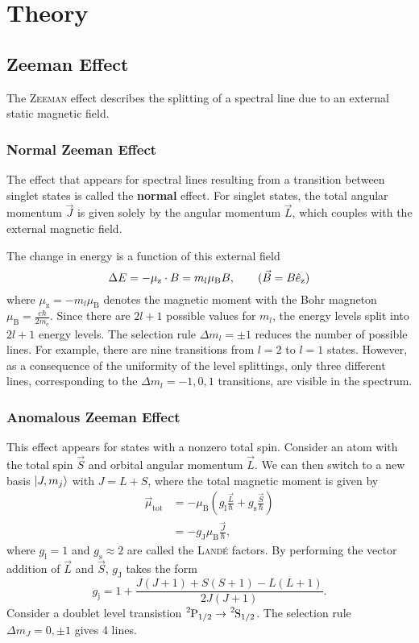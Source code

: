 \chapter{Theory}
\section{Zeeman Effect}\label{sec:zeeman}
The \textsc{Zeeman} effect describes the splitting of a spectral line due to an external static magnetic field.

\subsection{Normal Zeeman Effect}
The effect that appears for spectral lines resulting from a transition between singlet states is called the \textbf{normal} effect.
For singlet states, the total angular momentum $\vec{J}$ is given solely by the angular momentum $\vec{L}$, which couples with the external magnetic field.

The change in energy is a function of this external field
\begin{equation*}
	\Delta E = -\mu_\text{z}\cdot B=m_l\mu_\text{B}B, \tag{$\vec{B}=B\hat{e}_\text{z}$}
\end{equation*}
where $\mu_\text{z}=-m_l\mu_\text{B}$ denotes the magnetic moment with the Bohr magneton $\mu_\text{B}=\frac{e\hbar}{2m_\text{e}}$.
Since there are $2l+1$ possible values for $m_l$, the energy levels split into $2l+1$ energy levels.
The selection rule $\Delta m_l=\pm 1$ reduces the number of possible lines.
For example, there are nine transitions from $l=2$ to $l=1$ states.
However, as a consequence of the uniformity of the level splittings, only three different lines, corresponding to the $\Delta m_l=-1,0,1$ transitions, are visible in the spectrum.

\subsection{Anomalous Zeeman Effect}
This effect appears for states with a nonzero total spin.
Consider an atom with the total spin $\vec{S}$ and orbital angular momentum $\vec{L}$.
We can then switch to a new basis $\ket{J, m_j}$ with $J=L+S$, where the total magnetic moment is given by
\begin{align*}
	\vec{\mu}_\text{tot} &= -\mu_\text{B}\left(g_\text{l}\frac{\vec{L}}{\hbar} + g_\text{s}\frac{\vec{S}}{\hbar}\right) \\
	&= -g_\text{J}\mu_\text{B}\frac{\vec{J}}{\hbar},
\end{align*}
where $g_\text{l} = 1$ and $g_\text{s}\approx 2$ are called the \textsc{Landé} factors.
By performing the vector addition of $\vec{L}$ and $\vec{S}$, $g_\text{J}$ takes the form
\begin{equation*}
	g_\text{j} = 1+\frac{J(J+1)+S(S+1)-L(L+1)}{2J(J+1)}.
\end{equation*}
Consider a doublet level transistion $\ce{^{2}P}_{1/2}\rightarrow \ce{^{2}S}_{1/2}$.
The selection rule $\Delta m_J =0, \pm 1$ gives 4 lines.


